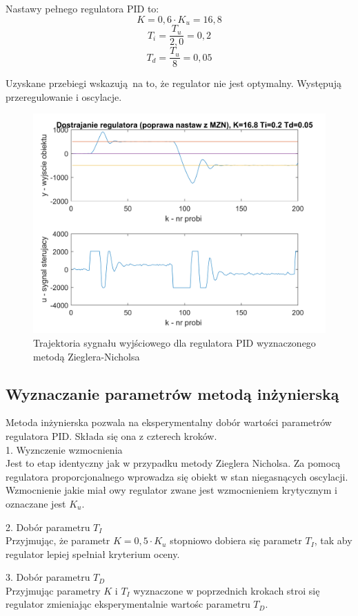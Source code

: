 \documentclass[a4paper, 10pt]{article}
\begin{document}
Nastawy pełnego regulatora PID to:
\[K = 0,6\cdot K_{u} = 16,8\]
\[T_{i} = \frac{T_{u}}{2,0} = 0,2\]
\[T_{d} = \frac{T_{u}}{8} = 0,05\]

Uzyskane przebiegi wskazują na to, że regulator nie jest optymalny. Występują przeregulowanie i oscylacje. 

\begin{figure}[H]
	\centering
	\includegraphics[width=0.9\linewidth]{zn_bez}
	\caption{Trajektoria sygnału wyjściowego dla regulatora PID wyznaczonego metodą Zieglera-Nicholsa}
	\label{fig:znbez}
\end{figure}

\subsection{Wyznaczanie parametrów metodą inżynierską}
Metoda inżynierska pozwala na eksperymentalny dobór wartości parametrów regulatora PID. Składa się ona z czterech kroków. \\

1. Wyznczenie wzmocnienia\\
Jest to etap identyczny jak w przypadku metody Zieglera Nicholsa. Za pomocą regulatora proporcjonalnego wprowadza się obiekt w stan niegasnących oscylacji. Wzmocnienie jakie miał owy regulator zwane jest wzmocnieniem krytycznym i oznaczane jest $K_{u}$. 

2. Dobór parametru $T_{I}$\\
Przyjmując, że parametr $K=0,5\cdot K_{u}$ stopniowo dobiera się parametr $T_{I}$, tak aby regulator lepiej spełniał kryterium oceny.

3. Dobór parametru $T_{D}$\\
Przyjmując parametry $K$ i $T_{I}$ wyznaczone w poprzednich krokach stroi się regulator zmieniając eksperymentalnie wartośc parametru $T_{D}$.
\end{document}

